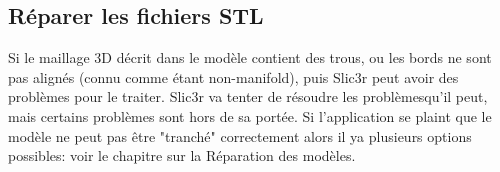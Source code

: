 
\subsection{R\'eparer les fichiers STL} %
\label{sub:cleaning_stls}
Si le maillage 3D d\'ecrit dans le mod\`ele contient des trous, ou les bords ne sont pas align\'es (connu comme \'etant non-manifold), puis Slic3r peut avoir des probl\`emes pour le traiter. Slic3r va tenter de r\'esoudre les probl\`emesqu'il peut, mais certains probl\`emes sont hors de sa port\'ee. Si l'application se plaint que le mod\`ele ne peut pas \^etre "tranch\'e" correctement alors il ya plusieurs options possibles: voir le chapitre sur la R\'eparation des mod\`eles.

